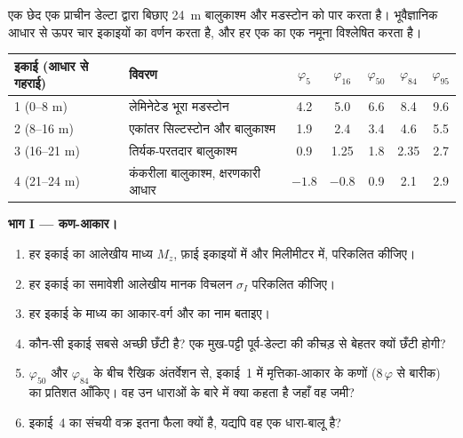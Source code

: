 \begin{problem}
\label{pb:b1:clastic-sediments:1}
एक छेद एक प्राचीन डेल्टा द्वारा बिछाए \qty{24}{m} बालुकाश्म और मडस्टोन को पार करता है। भूवैज्ञानिक आधार से ऊपर चार इकाइयों का वर्णन करता है, और हर एक का एक नमूना विश्लेषित करता है।

\smallskip
\begin{center}\small
\begin{tabular}{@{}llccccc@{}}
\hline
इकाई (आधार से गहराई) & विवरण & $\varphi_5$ & $\varphi_{16}$ & $\varphi_{50}$ & $\varphi_{84}$ & $\varphi_{95}$ \\
\hline
1 (0--8 m) & लेमिनेटेड भूरा मडस्टोन & 4.2 & 5.0 & 6.6 & 8.4 & 9.6 \\
2 (8--16 m) & एकांतर सिल्टस्टोन और बालुकाश्म & 1.9 & 2.4 & 3.4 & 4.6 & 5.5 \\
3 (16--21 m) & तिर्यक-परतदार बालुकाश्म & 0.9 & 1.25 & 1.8 & 2.35 & 2.7 \\
4 (21--24 m) & कंकरीला बालुकाश्म, क्षरणकारी आधार & $-1.8$ & $-0.8$ & 0.9 & 2.1 & 2.9 \\
\hline
\end{tabular}
\end{center}

\medskip
\noindent\textbf{भाग I --- कण-आकार।}
\begin{enumerate}
  \item हर इकाई का आलेखीय माध्य $M_z$, फ़ाई इकाइयों में और मिलीमीटर में, परिकलित कीजिए।
  \item हर इकाई का समावेशी आलेखीय मानक विचलन $\sigma_I$ परिकलित कीजिए।
  \item हर इकाई के माध्य का आकार-वर्ग और  का नाम बताइए।
  \item कौन-सी इकाई सबसे अच्छी छँटी है? एक मुख-पट्टी पूर्व-डेल्टा की कीचड़ से बेहतर क्यों छँटी होगी?
  \item $\varphi_{50}$ और $\varphi_{84}$ के बीच रैखिक अंतर्वेशन से, इकाई~1 में मृत्तिका-आकार के कणों ($8\,\varphi$ से बारीक) का प्रतिशत आँकिए। वह उन धाराओं के बारे में क्या कहता है जहाँ वह जमी?
  \item इकाई~4 का संचयी वक्र इतना फैला क्यों है, यद्यपि वह एक धारा-बालू है?
\end{enumerate}


\end{problem}
